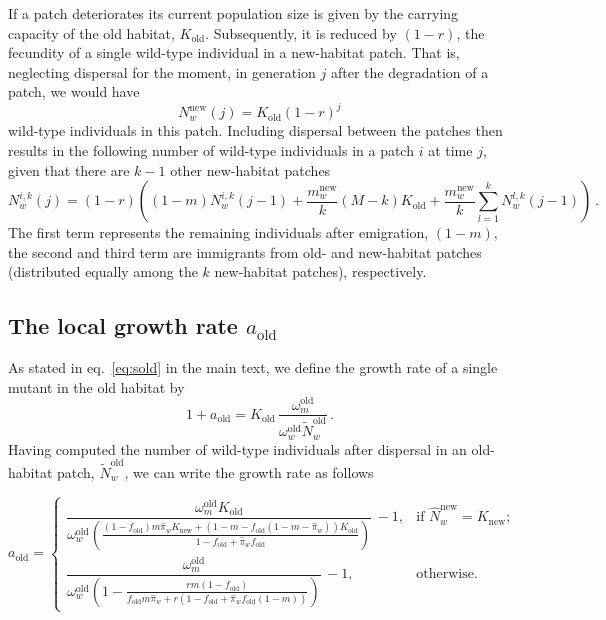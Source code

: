 \documentclass[11pt]{article}
\newcommand{\chg}[1]{\textcolor{change}{#1}}
\begin{document}
\chg{If a patch deteriorates its current population size is given by the carrying capacity of the old habitat, $K_{\text{old}}$. Subsequently, it is reduced by $(1-r)$, the fecundity of a single wild-type individual in a new-habitat patch. That is, neglecting dispersal for the moment, in generation $j$ after the degradation of a patch, we would have 
	\begin{equation}
	N_w^{\text{new}}(j) = K_{\text{old}}(1-r)^j
	\end{equation}
	wild-type individuals in this patch. Including dispersal between the patches then results in the following number of wild-type individuals in a patch $i$ at time $j$, given that there are $k-1$ other new-habitat patches
	\begin{equation}
	N_w^{i,k}(j) = (1-r)\left((1-m)N_w^{i,k}(j-1) + \frac{m_w^{\text{new}}}{k} (M-k) K_{\text{old}} + \frac{m_w^{\text{new}}}{k} \sum_{l=1}^k N_w^{l,k}(j-1) \right)\ .
	\end{equation}
	The first term represents the remaining individuals after emigration, $(1-m)$, the second and third term are immigrants from old- and new-habitat patches (distributed equally among the $k$ new-habitat patches), respectively. 
}

\subsection*{The local growth rate $a_{\text{old}}$}
As stated in eq.~\eqref{eq:sold} in the main text, we define the growth rate of a single mutant in the old habitat by
\begin{equation}
1 + a_{\text{old}} = K_{\text{old}}\, \dfrac{\omega^\text{old}_m}{\omega^\text{old}_w \widetilde{N}_w^{\text{old}}}\, .    
\end{equation}
%
Having computed the number of wild-type individuals after dispersal in an old-habitat patch, $\widetilde{N}_w^{\text{old}}$, we can write the growth rate as follows

\begin{equation}\label{Seq:s_old}
a_{\text{old}} = \left\{ \begin{array}{ll}
\dfrac{\omega^\text{old}_m K_{\text{old}}}{\omega^\text{old}_w \left(\frac{(1-f_{\text{old}})m\widehat{\pi}_w K_{\text{new}} + (1-m-f_{\text{old}}(1-m-\widehat{\pi}_w))K_{\text{old}}}{1-f_{\text{old}}+\widehat{\pi}_w f_{\text{old}}} \right)}\, - 1 , & \text{if } \widehat{N}_w^{\text{new}} = K_{\text{new}};  \\
\dfrac{\omega^\text{old}_m}{\omega^\text{old}_w \left(1 - \frac{rm(1-f_{\text{old}})}{f_{\text{old}}m\widehat{\pi}_w + r(1-f_{\text{old}}+\widehat{\pi}_w f_{\text{old}}(1-m))}\right)}\, - 1 , & \text{otherwise}. 
\end{array}
\right.
\end{equation}
\end{document}
